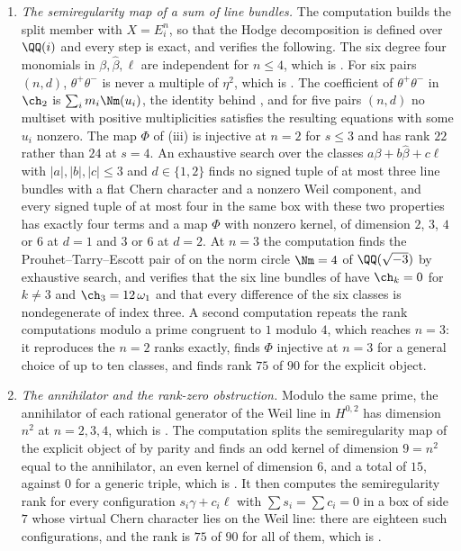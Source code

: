 \begin{enumerate}[label=\textup{(\Roman*)},leftmargin=*]
\item \emph{The semiregularity map of a sum of line bundles.} The
  computation builds the split member with $X=E_{i}^{n}$, so that the Hodge
  decomposition is defined over $\QQ(i)$ and every step is exact, and
  verifies the following. The six degree four monomials in
  $\beta,\widehat\beta,\ell$ are independent for $n\le4$, which is
  . For six pairs $(n,d)$, $\theta^{+}\theta^{-}$ is
  never a multiple of $\eta^{2}$, which is . The
  coefficient of $\theta^{+}\theta^{-}$ in $\ch_{2}$ is
  $\sum_{i}m_{i}\Nm(u_{i})$, the identity behind , and
  for five pairs $(n,d)$ no multiset with positive multiplicities satisfies
  the resulting equations with some $u_{i}$ nonzero. The map $\Phi$ of
  (iii) is injective at $n=2$ for $s\le3$ and has rank
  $22$ rather than $24$ at $s=4$. An exhaustive search over the classes
  $a\beta+b\widehat\beta+c\ell$ with $|a|,|b|,|c|\le3$ and $d\in\{1,2\}$
  finds no signed tuple of at most three line bundles with a flat Chern
  character and a nonzero Weil component, and every signed tuple of at most
  four in the same box with these two properties has exactly four terms and a
  map $\Phi$ with nonzero kernel, of dimension $2$, $3$, $4$ or $6$ at $d=1$
  and $3$ or $6$ at $d=2$. At $n=3$ the computation finds the
  Prouhet--Tarry--Escott pair of  on the norm circle $\Nm=4$ of
  $\QQ(\sqrt{-3})$ by exhaustive search, and verifies that the six line
  bundles of  have $\ch_{k}=0$ for $k\ne3$ and
  $\ch_{3}=12\,\omega_{1}$ and that every difference of the six classes is
  nondegenerate of index three. A second computation repeats the rank
  computations modulo a prime congruent to $1$ modulo $4$, which reaches
  $n=3$: it reproduces the $n=2$ ranks exactly, finds $\Phi$ injective at
  $n=3$ for a general choice of up to ten classes, and finds rank $75$ of
  $90$ for the explicit object.

\item \emph{The annihilator and the rank-zero obstruction.} Modulo the same
  prime, the annihilator of each rational generator of the Weil line in
  $H^{0,2}$ has dimension $n^{2}$ at $n=2,3,4$, which is
  . The computation splits the semiregularity map of
  the explicit object of  by parity and finds an odd
  kernel of dimension $9=n^{2}$ equal to the annihilator, an even kernel of
  dimension $6$, and a total of $15$, against $0$ for a generic triple, which
  is . It then computes the semiregularity rank for
  every configuration $s_{i}\gamma+c_{i}\ell$ with $\sum s_{i}=\sum c_{i}=0$
  in a box of side $7$ whose virtual Chern character lies on the Weil line:
  there are eighteen such configurations, and the rank is $75$ of $90$ for
  all of them, which is .


\end{enumerate}
